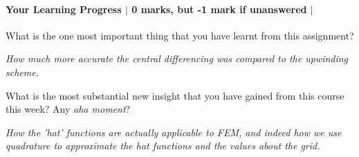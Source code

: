 \documentclass[10pt,letterpaper]{scrartcl}
\begin{document}
\paragraph*{Your Learning Progress $\vert$ 0 marks, but -1 mark if unanswered $\vert$ \faFilePdfO}
What is the one most important thing that you have learnt from this assignment?

\emph{How much more accurate the central differencing was compared to the upwinding scheme. }

What is the most substantial new insight that you have gained from this course this week? Any \emph{aha moment}?

\emph{How the 'hat' functions are actually applicable to FEM, and indeed how we use quadrature to approximate the hat functions and the values about the grid.}
\end{document}
